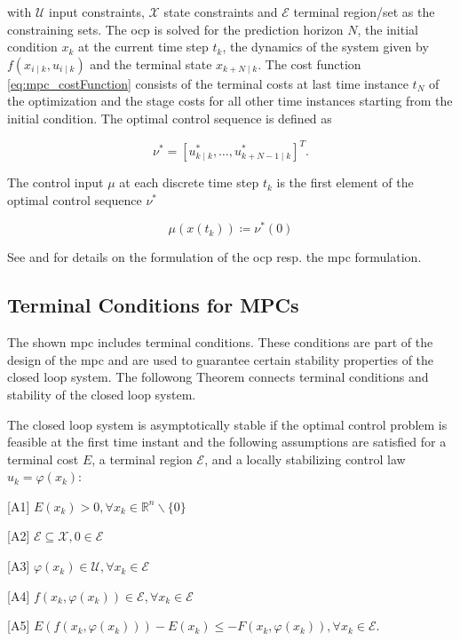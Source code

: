 \documentclass[10pt,a4paper]{article}
\begin{document}
with $\mathcal{U}$ input constraints,  $\mathcal{X}$ state constraints and $\mathcal{E}$ terminal region/set as the constraining sets.
The \gls{ocp} is solved for the prediction horizon $N$, the initial condition $x_k$ at the current time step $t_k$, the dynamics
of the system given by $f\left(x_{i \mid k}, u_{i \mid k}\right)$ and the terminal state $x_{k+N \mid k}$. The cost function \eqref{eq:mpc_costFunction}
consists of the terminal costs at last time instance $t_N$ of the optimization and the stage costs for all other time instances starting from
the initial condition. The optimal control sequence is defined as

\begin{equation}
	\nu^* = [u_{k \mid k}^*, \dots , u_{k+N-1\mid k}^*]^T.
\end{equation}

The control input $\mu$ at each discrete time step $t_k$ is the first element of the optimal control sequence $\nu^*$

\begin{equation}
\mu(x(t_k)) \coloneqq \nu^*(0)
\end{equation}

See \cite{nmpcBible} and \cite{RaffAllgoewer} for details on the formulation of the \gls{ocp} resp. the \gls{mpc} formulation.

\subsection{Terminal Conditions for MPCs}
The shown \gls{mpc} includes terminal conditions. These conditions are part of the design of the \gls{mpc} and are used to
guarantee certain stability properties of the closed loop system. The followong Theorem connects terminal conditions and
stability of the closed loop system. \cite{RaffAllgoewer}

\begin{tcolorbox}[colback=gray!20, colframe=gray!80,title=Theorem 1,arc=0.0mm]
The closed loop system is asymptotically stable if the optimal control problem is feasible at the first time instant and
the following assumptions are satisfied for a terminal cost $E$, a terminal region $\mathcal{E}$, and a locally stabilizing
control law $u_{k}=\varphi\left(x_{k}\right)$:

[A1] $E\left(x_{k}\right)>0, \forall x_{k} \in \mathbb{R}^{n} \backslash\{0\}$

[A2]  $\mathcal{E} \subseteq \mathcal{X}, 0 \in \mathcal{E}$

[A3] $\varphi\left(x_{k}\right) \in \mathcal{U}, \forall x_{k} \in \mathcal{E}$

[A4] $f\left(x_{k}, \varphi\left(x_{k}\right)\right) \in \mathcal{E}, \forall x_{k} \in \mathcal{E}$

[A5] $E\left(f\left(x_{k}, \varphi\left(x_{k}\right)\right)\right)-E\left(x_{k}\right) \leq-F\left(x_{k}, \varphi\left(x_{k}\right)\right), \forall x_{k} \in \mathcal{E}$.
\end{tcolorbox}
\end{document}
